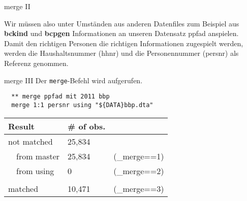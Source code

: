 \begin{frame}[fragile]{merge II} 
\begin{minipage}{11cm}
Wir müssen also unter Umständen aus anderen Datenfiles zum Beispiel aus \textbf{bckind} und \textbf{bcpgen} Informationen an unseren Datensatz ppfad anspielen. Damit den richtigen Personen die richtigen Informationen zugespielt werden, werden die Haushaltsnummer (hhnr) und die Personennummer (persnr) als Referenz genommen.\\

\end{minipage}
\end{frame}


\begin{frame}[fragile]{merge III}
Der \texttt{merge}-Befehl wird aufgerufen. 

\begin{lstlisting}
  ** merge ppfad mit 2011 bbp
  merge 1:1 persnr using "${DATA}bbp.dta"
\end{lstlisting}

\begin{table}
\begin{center}
\begin{scriptsize}
\begin{tabular}{lll}
 Result & \# of obs. & \\ 
 \midrule
 not matched & 25,834 & \\
 ~~from master & 25,834  &(\_merge==1) \\
 ~~from using  & 0 &(\_merge==2) \\
 & & \\
 matched & 10,471 & (\_merge==3) \\
 \midrule
\end{tabular}
\end{scriptsize}
\end{center}
\end{table}

\end{frame}

